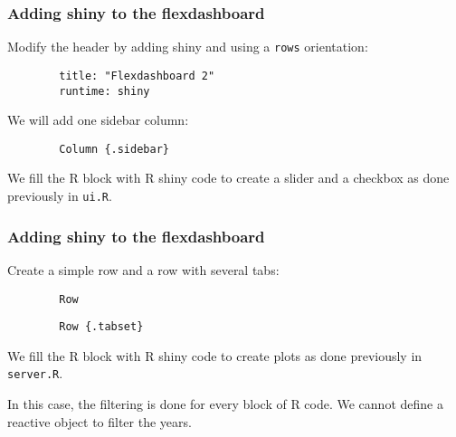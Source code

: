 \documentclass{beamer}
\begin{document}
	\begin{frame}[fragile]
		\frametitle{Adding shiny to the flexdashboard}

		Modify the header by adding shiny and using a \verb|rows| orientation:
		
		\begin{exampleblock}{}
		\begin{BVerbatim}
		title: "Flexdashboard 2"
		runtime: shiny
		\end{BVerbatim}
		\end{exampleblock}{}

		\vspace{2em}

		We will add one sidebar column:
		
		\begin{exampleblock}{}
		\begin{BVerbatim}
		Column {.sidebar}
		\end{BVerbatim}
		\end{exampleblock}{}

		\vspace{2em}

		We fill the R block with R shiny code to create a slider and a checkbox as done previously in \verb|ui.R|.

	\end{frame}

	\begin{frame}[fragile]
		\frametitle{Adding shiny to the flexdashboard}

		Create a simple row and a row with several tabs:
		
		\begin{exampleblock}{}
		\begin{BVerbatim}
		Row
		\end{BVerbatim}
		\end{exampleblock}{}

		\begin{exampleblock}{}
		\begin{BVerbatim}
		Row {.tabset}
		\end{BVerbatim}
		\end{exampleblock}{}

		\vspace{2em}

		We fill the R block with R shiny code to create plots as done previously in \verb|server.R|.

		\vspace{2em}

		In this case, the filtering is done for every block of R code. We cannot define a reactive object to filter the years.
 	
	\end{frame}
\end{document}
